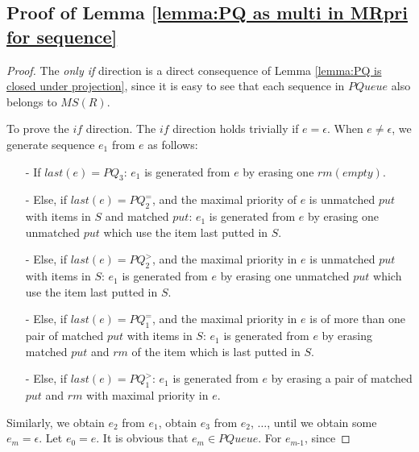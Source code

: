\subsection{Proof of Lemma \ref{lemma:PQ as multi in MRpri for sequence}}

\PQasMultiInMRpriforSequence*

\begin {proof}

The \textit{only if} direction is a direct consequence of Lemma \ref{lemma:PQ is closed under projection}, since it is easy to see that each sequence in $\textit{PQueue}$ also belongs to $\textit{MS}(R)$.

To prove the $\textit{if}$ direction. The $\textit{if}$ direction holds trivially if $e = \epsilon$. When $e \neq \epsilon$, we generate sequence $e_1$ from $e$ as follows:

\begin{itemize}
\setlength{\itemsep}{0.5pt}
\item[-] If $\textit{last}(e) = \textit{PQ}_3$: $e_1$ is generated from $e$ by erasing one $\textit{rm}(\textit{empty})$.

\item[-] Else, if $\textit{last}(e) = \textit{PQ}_2^{=}$, and the maximal priority of $e$ is unmatched $\textit{put}$ with items in $S$ and matched $\textit{put}$: $e_1$ is generated from $e$ by erasing one unmatched $\textit{put}$ which use the item last putted in $S$.

\item[-] Else, if $\textit{last}(e) = \textit{PQ}_2^{>}$, and the maximal priority in $e$ is unmatched $\textit{put}$ with items in $S$: $e_1$ is generated from $e$ by erasing one unmatched $\textit{put}$ which use the item last putted in $S$.

\item[-] Else, if $\textit{last}(e) = \textit{PQ}_1^{=}$, and the maximal priority in $e$ is of more than one pair of matched $\textit{put}$ with items in $S$: $e_1$ is generated from $e$ by erasing matched $\textit{put}$ and $\textit{rm}$ of the item which is last putted in $S$.

\item[-] Else, if $\textit{last}(e) = \textit{PQ}_1^{>}$: $e_1$ is generated from $e$ by erasing a pair of matched $\textit{put}$ and $\textit{rm}$ with maximal priority in $e$.
\end{itemize}

Similarly, we obtain $e_2$ from $e_1$, obtain $e_3$ from $e_2$, $\ldots$, until we obtain some $e_m = \epsilon$. Let $e_0=e$. It is obvious that $e_m \in \textit{PQueue}$. For $e_{\textit{m-1}}$, since


\end{proof}
